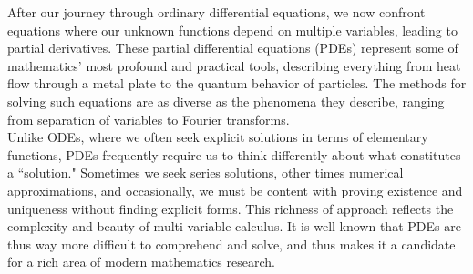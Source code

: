 \vspace{1.3em}

\newpage

 

\noindent After our journey through ordinary differential equations, we now confront equations where our unknown functions depend on multiple variables, leading to partial derivatives. These partial differential equations (PDEs) represent some of mathematics' most profound and practical tools, describing everything from heat flow through a metal plate to the quantum behavior of particles. The methods for solving such equations are as diverse as the phenomena they describe, ranging from separation of variables to Fourier transforms. \\

\noindent Unlike ODEs, where we often seek explicit solutions in terms of elementary functions, PDEs frequently require us to think differently about what constitutes a ``solution." Sometimes we seek series solutions, other times numerical approximations, and occasionally, we must be content with proving existence and uniqueness without finding explicit forms. This richness of approach reflects the complexity and beauty of multi-variable calculus. It is well known that PDEs are thus way more difficult to comprehend and solve, and thus makes it a candidate for a rich area of modern mathematics research.

